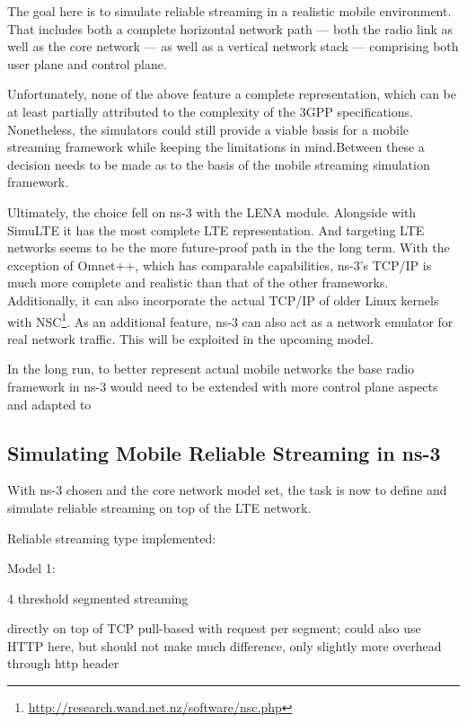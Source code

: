 The goal here is to simulate reliable streaming in a realistic mobile environment. That includes both a complete horizontal network path --- both the radio link as well as the core network --- as well as a vertical network stack --- comprising both user plane and control plane.

Unfortunately, none of the above feature a complete representation, which can be at least partially attributed to the complexity of the \gls{3GPP} specifications. Nonetheless, the simulators could still provide a viable basis for a mobile streaming framework while keeping the limitations in mind.Between these a decision needs to be made as to the basis of the mobile streaming simulation framework. 

Ultimately, the choice fell on ns-3 with the LENA module. Alongside with SimuLTE it has the most complete \gls{LTE} representation. And targeting \gls{LTE} networks seems to be the more future-proof path in the the long term. With the exception of Omnet++, which has comparable capabilities, ns-3's \gls{TCP}/\gls{IP} is much more complete and realistic than that of the other frameworks. Additionally, it can also incorporate the actual \gls{TCP}/\gls{IP} of older Linux kernels with NSC\footnote{\url{http://research.wand.net.nz/software/nsc.php}}. As an additional feature, ns-3 can also act as a network emulator for real network traffic. This will be exploited in the upcoming model.

In the long run, to better represent actual mobile networks the base radio framework in ns-3 would need to be extended with more control plane aspects and adapted to 


\subsection{Simulating Mobile Reliable Streaming in ns-3}

With ns-3 chosen and the core network model set, the task is now to define and simulate reliable streaming on top of the \gls{LTE} network.



Reliable streaming type implemented:

Model 1:

4 threshold segmented streaming

directly on top of TCP
pull-based with request per segment; could also use HTTP here, but should not make much difference, only slightly more overhead through http header


